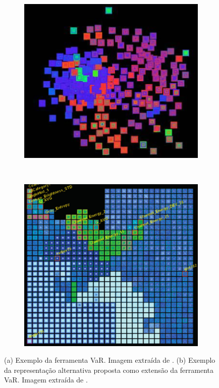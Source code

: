 \begin{figure}[h!]
  \centering
  \begin{subfigure}[b]{0.5\textwidth}
    \centering
    \includegraphics[width=\textwidth]{images/var1.png}
    \caption{}
    \label{fig:var1}
  \end{subfigure}%
  ~ %
  \begin{subfigure}[b]{0.475\textwidth}
    \centering
    \includegraphics[width=\textwidth]{images/var2.png}
    \caption{}
    \label{fig:var2}
  \end{subfigure}
  \caption[VaR: Value and Relation]
      {(a) Exemplo da ferramenta VaR. Imagem extraída de
      \cite{Yang2004}. (b) Exemplo da representação
  alternativa proposta como extensão da ferramenta VaR.
  Imagem extraída  de \cite{Yang2007}.}
\end{figure}

